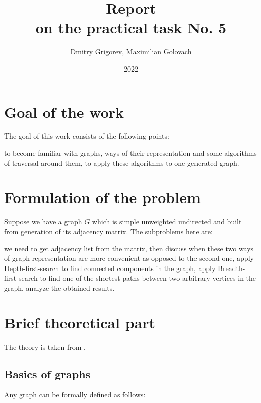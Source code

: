 \documentclass[12pt, bachelor, substylefile = algo_title.rtx]{disser}
\theoremstyle{definition}
\begin{document}
\title{Report\\
on the practical task No. 5}


\author{Dmitry Grigorev, Maximilian Golovach}
\sastatus {}

\date{2022}

\maketitle
\section{Goal of the work}
The goal of this work consists of the following points:
\begin{outline}
\1 to become familiar with graphs, ways of their representation and some algorithms of traversal around them,
\1 to apply these algorithms to one generated graph.
\end{outline}

\section{Formulation of the problem}
Suppose we have a graph $G$ which is simple unweighted undirected and built from generation of its adjacency matrix. The subproblems here are:
\begin{outline}[enumerate]
\1 we need to get adjacency list from the matrix,
\1 then discuss when these two ways of graph representation are more convenient as opposed to the second one,
\1 apply Depth-first-search to find connected components in the graph,
\1 apply Breadth-first-search to find one of the shortest paths between two arbitrary vertices in the graph,
\1 analyze the obtained results.
\end{outline}

\section{Brief theoretical part}
The theory is taken from \cite{erciyes18}.

\subsection{Basics of graphs}
Any graph can be formally defined as follows:
\end{document}
